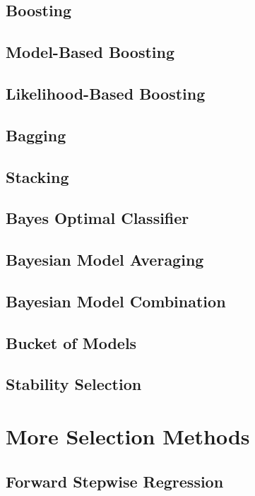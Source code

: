 \subsection{Boosting}
\subsection{Model-Based Boosting}
\subsection{Likelihood-Based Boosting}
\subsection{Bagging}
\subsection{Stacking}
\subsection{Bayes Optimal Classifier}
\subsection{Bayesian Model Averaging}
\subsection{Bayesian Model Combination}
\subsection{Bucket of Models}
\subsection{Stability Selection}

\section{More Selection Methods}
\subsection{Forward Stepwise Regression}

